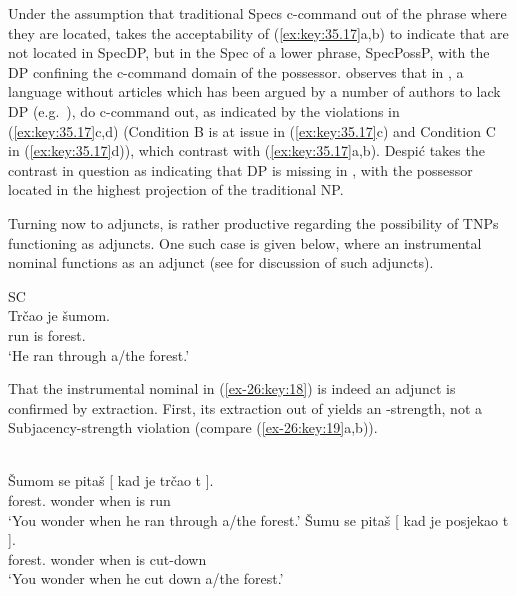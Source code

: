 \documentclass[output=paper]{langsci/langscibook}
\begin{document}
Under the assumption that traditional Specs c-command out of the phrase where
they are located, \citet{Kayne1994} takes the acceptability of (\ref{ex:key:35.17}a,b) to
indicate that   are not located in SpecDP, but in the Spec of
a lower phrase, SpecPossP, with the DP confining the c-command domain of the
possessor. \textcite{Despic2011,Despic2013} observes that in , a
language without articles which has been argued by a number of authors to lack
DP (e.g.\
\citealt{Corver1992,Zlatic1997,Trenkic2004,Boskovic2005,Boskovic2012,%
    Boskovic2014,Marelj2011,Despic2011,Despic2013,Runic2014a,Runic2014b,%
Takahashi2012,Talic2014,Talic2015}), \isi{possessors} do c-command out, as indicated
by the \isi{binding} violations in (\ref{ex:key:35.17}c,d) (Condition B is at
issue in (\ref{ex:key:35.17}c) and Condition C in (\ref{ex:key:35.17}d)), which contrast with 
(\ref{ex:key:35.17}a,b). Despić takes the contrast in question as indicating
that DP is missing in \glsentrytext{SC}, with the possessor located in the
highest projection of the traditional NP.

Turning now to adjuncts,  is rather productive
regarding the possibility of \glspl{TNP} functioning as
adjuncts. One such case is given below, where an instrumental
nominal functions as an adjunct (see \citealt{Boskovic2018} for discussion of
such adjuncts).

\ea\label{ex-26:key:18}\glsdesc{SC}\\
    \gll Trčao  je  šumom.\\
            run is forest.\Ins{}\\
	\glt    \enquote*{He ran through a/the forest.}
\z

That the instrumental nominal in (\ref{ex-26:key:18}) is indeed an adjunct is
confirmed by extraction. First, its extraction out of \isi{islands} yields an
\glsentrytext{ECP}-strength, not a Subjacency-strength violation (compare
(\ref{ex-26:key:19}a,b)).

\ea\label{ex-26:key:19} \\
    \ea
        \gll    \llap{*}Šumom se pitaš [ kad je trčao t ].\\
                forest.\Ins{} \Refl{} wonder {} when is run\\
        \glt    \enquote*{You wonder when he ran through a/the forest.}
	\ex
        \gll    {}Šumu se pitaš [ kad je posjekao t ].\\
                forest.\Acc{} \Refl{} wonder {} when is cut-down\\
        \glt    \enquote*{You wonder when he cut down a/the forest.}
	\z
\z
\end{document}
